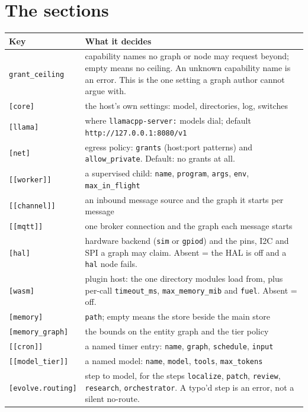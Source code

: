 \section{The sections}

\begin{longtable}{@{}>{\raggedright\arraybackslash}p{}>{\raggedright\arraybackslash}p{}@{}}
  \toprule
  \textbf{Key} & \textbf{What it decides} \\
  \midrule
  \endhead
  \texttt{grant\_ceiling} & capability names no graph or node may request beyond; empty means
    no ceiling. An unknown capability name is an error. This is the one setting a graph
    author cannot argue with. \\
  \texttt{[core]} & the host's own settings: model, directories, log, switches \\
  \texttt{[llama]} & where \texttt{llamacpp-server:} models dial; default
    \texttt{http://127.0.0.1:8080/v1} \\
  \texttt{[net]} & egress policy: \texttt{grants} (host:port patterns) and
    \texttt{allow\_private}. Default: no grants at all. \\
  \texttt{[[worker]]} & a supervised child: \texttt{name}, \texttt{program},
    \texttt{args}, \texttt{env}, \texttt{max\_in\_flight} \\
  \texttt{[[channel]]} & an inbound message source and the graph it starts per message \\
  \texttt{[[mqtt]]} & one broker connection and the graph each message starts \\
  \texttt{[hal]} & hardware backend (\texttt{sim} or \texttt{gpiod}) and the pins, I2C and
    SPI a graph may claim. Absent = the HAL is off and a \texttt{hal} node fails. \\
  \texttt{[wasm]} & plugin host: the one directory modules load from, plus per-call
    \texttt{timeout\_ms}, \texttt{max\_memory\_mib} and \texttt{fuel}. Absent = off. \\
  \texttt{[memory]} & \texttt{path}; empty means the store beside the main store \\
  \texttt{[memory\_graph]} & the bounds on the entity graph and the tier policy \\
  \texttt{[[cron]]} & a named timer entry: \texttt{name}, \texttt{graph},
    \texttt{schedule}, \texttt{input} \\
  \texttt{[[model\_tier]]} & a named model: \texttt{name}, \texttt{model},
    \texttt{tools}, \texttt{max\_tokens} \\
  \texttt{[evolve.routing]} & step to model, for the steps \texttt{localize},
    \texttt{patch}, \texttt{review}, \texttt{research}, \texttt{orchestrator}. A typo'd step
    is an error, not a silent no-route. \\
  \bottomrule
\end{longtable}

